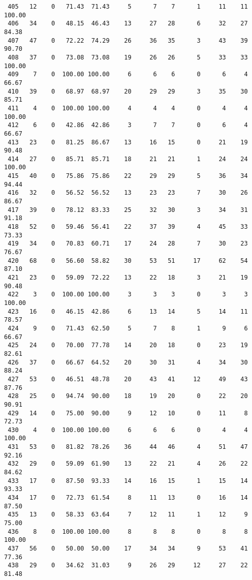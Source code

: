 \begin{verbatim}
 405   12    0   71.43  71.43     5      7    7      1     11    11   100.00
 406   34    0   48.15  46.43    13     27   28      6     32    27    84.38
 407   47    0   72.22  74.29    26     36   35      3     43    39    90.70
 408   37    0   73.08  73.08    19     26   26      5     33    33   100.00
 409    7    0  100.00 100.00     6      6    6      0      6     4    66.67
 410   39    0   68.97  68.97    20     29   29      3     35    30    85.71
 411    4    0  100.00 100.00     4      4    4      0      4     4   100.00
 412    6    0   42.86  42.86     3      7    7      0      6     4    66.67
 413   23    0   81.25  86.67    13     16   15      0     21    19    90.48
 414   27    0   85.71  85.71    18     21   21      1     24    24   100.00
 415   40    0   75.86  75.86    22     29   29      5     36    34    94.44
 416   32    0   56.52  56.52    13     23   23      7     30    26    86.67
 417   39    0   78.12  83.33    25     32   30      3     34    31    91.18
 418   52    0   59.46  56.41    22     37   39      4     45    33    73.33
 419   34    0   70.83  60.71    17     24   28      7     30    23    76.67
 420   68    0   56.60  58.82    30     53   51     17     62    54    87.10
 421   23    0   59.09  72.22    13     22   18      3     21    19    90.48
 422    3    0  100.00 100.00     3      3    3      0      3     3   100.00
 423   16    0   46.15  42.86     6     13   14      5     14    11    78.57
 424    9    0   71.43  62.50     5      7    8      1      9     6    66.67
 425   24    0   70.00  77.78    14     20   18      0     23    19    82.61
 426   37    0   66.67  64.52    20     30   31      4     34    30    88.24
 427   53    0   46.51  48.78    20     43   41     12     49    43    87.76
 428   25    0   94.74  90.00    18     19   20      0     22    20    90.91
 429   14    0   75.00  90.00     9     12   10      0     11     8    72.73
 430    4    0  100.00 100.00     6      6    6      0      4     4   100.00
 431   53    0   81.82  78.26    36     44   46      4     51    47    92.16
 432   29    0   59.09  61.90    13     22   21      4     26    22    84.62
 433   17    0   87.50  93.33    14     16   15      1     15    14    93.33
 434   17    0   72.73  61.54     8     11   13      0     16    14    87.50
 435   13    0   58.33  63.64     7     12   11      1     12     9    75.00
 436    8    0  100.00 100.00     8      8    8      0      8     8   100.00
 437   56    0   50.00  50.00    17     34   34      9     53    41    77.36
 438   29    0   34.62  31.03     9     26   29     12     27    22    81.48

\end{verbatim}
